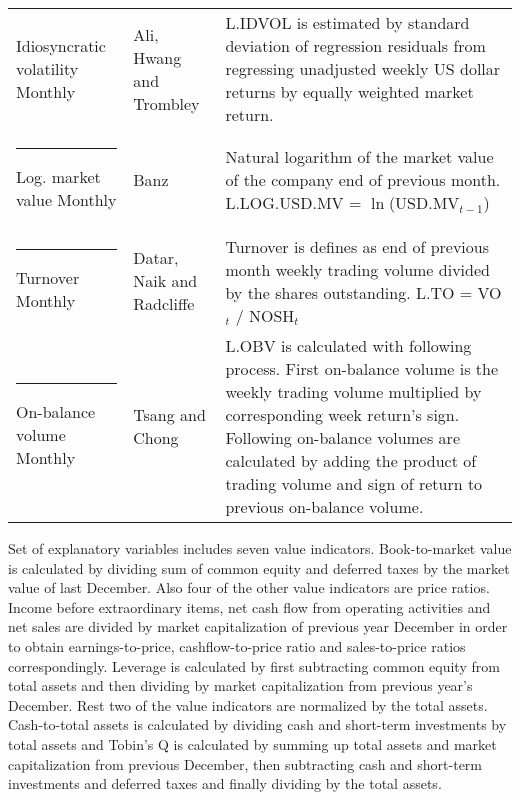 \documentclass{article}
\begin{document}
{{\begin{xltabular}{\textwidth}{ >{\raggedright\arraybackslash}p{0.23\textwidth} >{\raggedright\arraybackslash}p{0.2\textwidth} X}
Idiosyncratic volatility \newline Monthly & Ali, Hwang and Trombley \citeyear{ali2003}	& L.IDVOL is estimated by standard deviation of regression residuals from regressing unadjusted weekly US dollar returns by equally weighted market return. \\ \rule{-1ex}{3ex}
Log. market value \newline Monthly 	& Banz \citeyear{BANZ1981}				& Natural logarithm of the market value of the company end of previous month. \newline L.LOG.USD.MV = $\ln$(USD.MV$_{t-1}$)\\ \rule{-1ex}{3ex}
Turnover \newline Monthly 		& Datar, Naik and Radcliffe \citeyear{datar1998} & Turnover is defines as end of previous month weekly trading volume divided by the shares outstanding. \newline L.TO = VO$_t$ / NOSH$_t$ \\ \rule{-1ex}{3ex}
On-balance volume \newline Monthly & Tsang and Chong \citeyear{tsang2009}		& L.OBV is calculated with following process. First on-balance volume is the weekly trading volume multiplied by corresponding week return's sign. Following on-balance volumes are calculated by adding the product of trading volume and sign of return to previous on-balance volume.\\ 
\bottomrule
\end{xltabular}
}}

Set of explanatory variables includes seven value indicators. Book-to-market value is calculated by dividing sum of common equity and deferred taxes by the market value of last December. Also four of the other value indicators are price ratios. Income before extraordinary items, net cash flow from operating activities and net sales are divided by market capitalization of previous year December in order to obtain earnings-to-price, cashflow-to-price ratio and sales-to-price ratios correspondingly. Leverage is calculated by first subtracting common equity from total assets and then dividing by market capitalization from previous year's December. Rest two of the value indicators are normalized by the total assets. Cash-to-total assets is calculated by dividing cash and short-term investments by total assets and Tobin's Q is calculated by summing up total assets and market capitalization from previous December, then subtracting cash and short-term investments and deferred taxes and finally dividing by the total assets. \par
\end{document}

